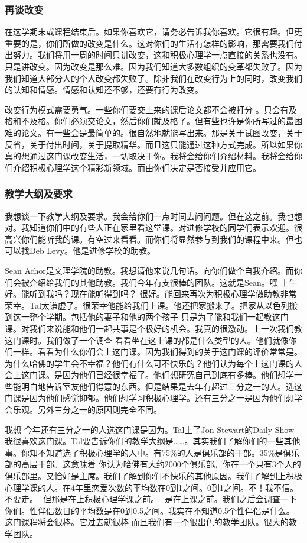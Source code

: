 \subsubsection{再谈改变}
在这学期末或课程结束后。如果你喜欢它，请务必告诉我你喜欢。它很有趣。但更重要的是，你们所做的改变是什么。这对你们的生活有怎样的影响，那需要我们付出努力。我们将用一周的时间只讲改变，这和积极心理学一点直接的关系也没有。只是讲改变。因为改变是那么难。因为我们知道大多数组织的变革都失败了。因为我们知道大部分人的个人改变都失败了。除非我们在改变行为上的同时，改变我们的认知和情感。情感和认知还不够，还要有行为改变。

改变行为模式需要勇气。一些你们要交上来的课后论文都不会被打分 。只会有及格和不及格。你们必须交论文，然后你们就及格了。但有些也许是你所写过的最困难的论文。有一些会是最简单的。很自然地就能写出来。那是关于试图改变，关于反省，关于付出时间，关于提取精华。而且这只能通过这种方式完成。所以如果你真的想通过这门课改变生活，一切取决于你。我将会给你们介绍材料。我将会给你们介绍积极心理学这个精彩新领域。而由你们决定是否接受并应用它。

\subsubsection{教学大纲及要求}
我想谈一下教学大纲及要求。我会给你们一点时间去问问题。但在这之前。我也想对。我知道你们中的有些人正在家里看这堂课。对进修学校的同学们表示欢迎。很高兴你们能听我的课。有空过来看看。而你们将显然参与到我们的课程中来。但也可以找Deb Levy。他是进修学校的助教。

Sean Achor是文理学院的助教。我想请他来说几句话。向你们做个自我介绍。而你们会被介绍给我们的其他助教。我们今年有支很棒的团队。这就是Sean。嘿 上午好。能听到我吗？现在能听得到吗？ 很好。能回来再次为积极心理学做助教非常荣幸。Tal太谦虚了。很荣幸他能给我们上课。他还把家搬来了。把家从以色列搬到这一整个学期。包括他的妻子和他的两个孩子 只是为了能和我们一起教这门课。对我们来说能和他们一起共事是个极好的机会。我真的很激动。上一次我们教这门课时。我们做了一个调查 看看坐在这上课的都是什么类型的人。他们就像你们一样。看看为什么你们会上这门课。因为我们得到的关于这门课的评价常常是。为什么哈佛的学生会不幸福？他们有什么可不快乐的？他们认为每个上这门课的人会上这门课。是因为他们已经很幸福了。他们想研究自己到底有多棒。他们想学一些能明白地告诉室友他们得意的东西。但是结果是去年有超过三分之一的人。选这门课是因为他们感觉抑郁。他们想学习积极心理学。还有三分之一是因为他们想学会乐观。另外三分之一的原因则完全不同。 

我想 今年还有三分之一的人选这门课是因为。Tal上了Jon Stewart的Daily Show 我很喜欢这门课。Tal要告诉你们的教学大纲是……。其实我们了解你们的一些其他事。你知不知道选了积极心理学的人中。有75\%的人是俱乐部的干部。35\%是俱乐部的高层干部。这意味着 你认为哈佛有大约2000个俱乐部。你在一个只有3个人的俱乐部里。又恰好是主席。我们了解到你们不快乐的其他原因。我们了解到上积极心理学课的人。在4年里恋爱次数的平均数在0到1之间。0到1之间。不！我不信。不要走。- 但那是在上积极心理学课之前。- 是在上课之前。我们之后会调查一下你们。性伴侣数目的平均数是在0到0.5之间。我实在不知道0.5个性伴侣是什么。这门课程将会很棒。它过去就很棒 而且我们有一个很出色的教学团队。很大的教学团队。 

